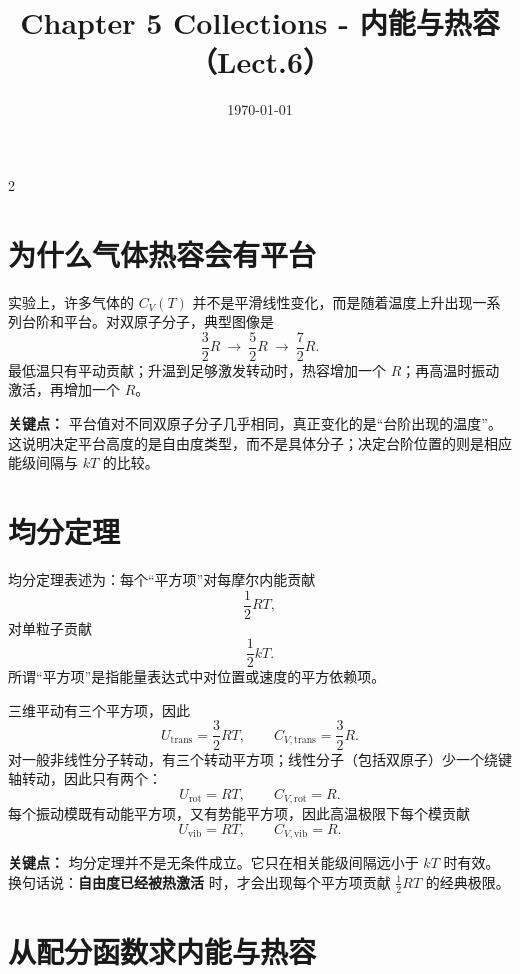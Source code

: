 \documentclass[a4paper,9pt]{article}
\title{\vspace{-2em}\Large\bfseries\color{sectioncolor} Chapter 5 Collections - 内能与热容（Lect.6）\vspace{-1em}}
\author{}
\date{\today}
\newenvironment{keypoint}
{\par\vspace{0.3em}\noindent\begin{tcolorbox}[colback=keybg,colframe=keycolor,boxrule=0.5pt,arc=2pt,left=2pt,right=2pt,top=2pt,bottom=2pt,boxsep=0pt]\noindent\textcolor{keycolor}{\textbf{关键点：}}}
{\end{tcolorbox}\par\vspace{0.3em}}
\begin{document}
\maketitle
\thispagestyle{fancy}
\begin{multicols}{2}
	\scriptsize{\tableofcontents}

	\section{为什么气体热容会有平台}

	实验上，许多气体的 $C_V(T)$ 并不是平滑线性变化，而是随着温度上升出现一系列台阶和平台。对双原子分子，典型图像是
	\[
		\frac32R\ \longrightarrow\ \frac52R\ \longrightarrow\ \frac72R.
	\]
	最低温只有平动贡献；升温到足够激发转动时，热容增加一个 $R$；再高温时振动激活，再增加一个 $R$。

	\begin{keypoint}
		平台值对不同双原子分子几乎相同，真正变化的是“台阶出现的温度”。这说明决定平台高度的是自由度类型，而不是具体分子；决定台阶位置的则是相应能级间隔与 $kT$ 的比较。
	\end{keypoint}

	\section{均分定理}

	均分定理表述为：每个“平方项”对每摩尔内能贡献
	\[
		\frac12 RT,
	\]
	对单粒子贡献
	\[
		\frac12 kT.
	\]
	所谓“平方项”是指能量表达式中对位置或速度的平方依赖项。

	三维平动有三个平方项，因此
	\[
		U_{\mathrm{trans}}=\frac32RT,
		\qquad
		C_{V,\mathrm{trans}}=\frac32R.
	\]
	对一般非线性分子转动，有三个转动平方项；线性分子（包括双原子）少一个绕键轴转动，因此只有两个：
	\[
		U_{\mathrm{rot}}=RT,
		\qquad
		C_{V,\mathrm{rot}}=R.
	\]
	每个振动模既有动能平方项，又有势能平方项，因此高温极限下每个模贡献
	\[
		U_{\mathrm{vib}}=RT,
		\qquad
		C_{V,\mathrm{vib}}=R.
	\]

	\begin{keypoint}
		均分定理并不是无条件成立。它只在相关能级间隔远小于 $kT$ 时有效。换句话说：\textbf{自由度已经被热激活} 时，才会出现每个平方项贡献 $\frac12RT$ 的经典极限。
	\end{keypoint}

	\section{从配分函数求内能与热容}


\end{multicols}
\end{document}
